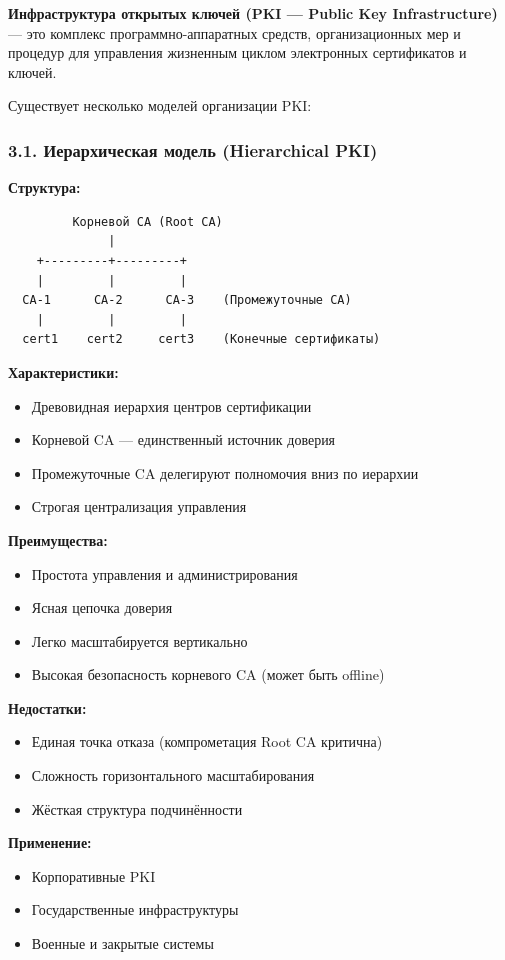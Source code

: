 \textbf{Инфраструктура открытых ключей (PKI — Public Key Infrastructure)} — это комплекс программно-аппаратных средств, организационных мер и процедур для управления жизненным циклом электронных сертификатов и ключей.

Существует несколько моделей организации PKI:

\subsubsection*{3.1. Иерархическая модель (Hierarchical PKI)}

\textbf{Структура:}
\begin{verbatim}
         Корневой CA (Root CA)
              |
    +---------+---------+
    |         |         |
  CA-1      CA-2      CA-3    (Промежуточные CA)
    |         |         |
  cert1    cert2     cert3    (Конечные сертификаты)
\end{verbatim}

\textbf{Характеристики:}
\begin{itemize}
    \item Древовидная иерархия центров сертификации
    \item Корневой CA — единственный источник доверия
    \item Промежуточные CA делегируют полномочия вниз по иерархии
    \item Строгая централизация управления
\end{itemize}

\textbf{Преимущества:}
\begin{itemize}
    \item Простота управления и администрирования
    \item Ясная цепочка доверия
    \item Легко масштабируется вертикально
    \item Высокая безопасность корневого CA (может быть offline)
\end{itemize}

\textbf{Недостатки:}
\begin{itemize}
    \item Единая точка отказа (компрометация Root CA критична)
    \item Сложность горизонтального масштабирования
    \item Жёсткая структура подчинённости
\end{itemize}

\textbf{Применение:}
\begin{itemize}
    \item Корпоративные PKI
    \item Государственные инфраструктуры
    \item Военные и закрытые системы
\end{itemize}

